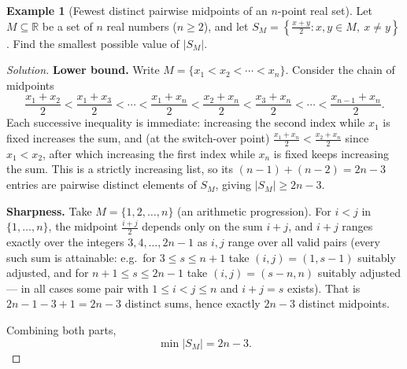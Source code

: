 \documentclass[11pt]{article}
\theoremstyle{definition}
\newtheorem{example}{Example}[section]
\newcommand{\R}{\mathbb{R}}
\begin{document}
\begin{example}[Fewest distinct pairwise midpoints of an $n$-point real set]
Let $M\subseteq\R$ be a set of $n$ real numbers ($n\ge2$), and let $S_M=\left\{\frac{x+y}2 : x,y\in M,\ x\ne y\right\}$. Find the smallest possible value of $|S_M|$.
\end{example}
\begin{proof}[Solution]
\textbf{Lower bound.} Write $M=\{x_1<x_2<\cdots<x_n\}$. Consider the chain of midpoints
\[
\frac{x_1+x_2}2<\frac{x_1+x_3}2<\cdots<\frac{x_1+x_n}2<\frac{x_2+x_n}2<\frac{x_3+x_n}2<\cdots<\frac{x_{n-1}+x_n}2.
\]
Each successive inequality is immediate: increasing the second index while $x_1$ is fixed increases the sum, and (at the switch-over point) $\tfrac{x_1+x_n}2<\tfrac{x_2+x_n}2$ since $x_1<x_2$, after which increasing the first index while $x_n$ is fixed keeps increasing the sum. This is a strictly increasing list, so its $(n-1)+(n-2)=2n-3$ entries are pairwise distinct elements of $S_M$, giving $|S_M|\ge2n-3$.

\textbf{Sharpness.} Take $M=\{1,2,\dots,n\}$ (an arithmetic progression). For $i<j$ in $\{1,\dots,n\}$, the midpoint $\tfrac{i+j}2$ depends only on the sum $i+j$, and $i+j$ ranges exactly over the integers $3,4,\dots,2n-1$ as $i,j$ range over all valid pairs (every such sum is attainable: e.g.\ for $3\le s\le n+1$ take $(i,j)=(1,s-1)$ suitably adjusted, and for $n+1\le s\le2n-1$ take $(i,j)=(s-n,n)$ suitably adjusted — in all cases some pair with $1\le i<j\le n$ and $i+j=s$ exists). That is $2n-1-3+1=2n-3$ distinct sums, hence exactly $2n-3$ distinct midpoints.

Combining both parts,
\[
\boxed{\min|S_M|=2n-3}.
\]
\end{proof}
\end{document}
